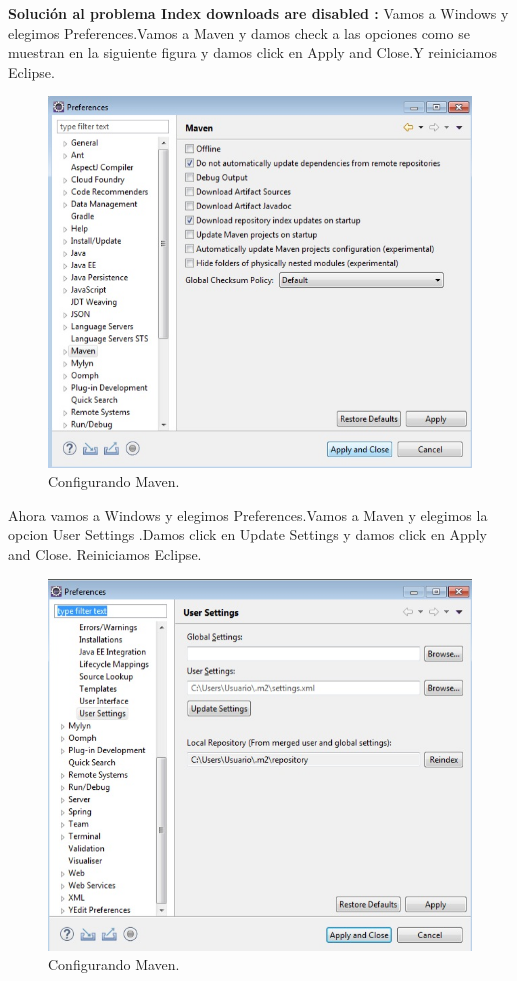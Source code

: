 \textbf{Soluci\'on al problema Index downloads are disabled :}
 Vamos a Windows y elegimos Preferences.Vamos a Maven y damos check a las opciones como se muestran en la siguiente figura y damos click en Apply and Close.Y reiniciamos Eclipse.
\begin{figure}[H] 
	\centering
	\includegraphics[scale=0.7]{images/c13_12.jpg}
	\caption{Configurando Maven.}
\end{figure}
Ahora vamos  a Windows y elegimos Preferences.Vamos a Maven y elegimos la opcion User Settings .Damos click   en Update Settings y damos  click en Apply and Close. 
Reiniciamos Eclipse.
\begin{figure}[H] 
	\centering
	\includegraphics[scale=0.7]{images/c13_13.jpg}
	\caption{Configurando Maven.}
\end{figure}
